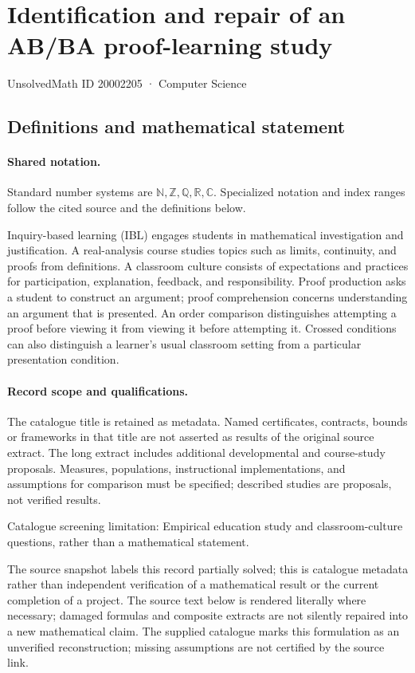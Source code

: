 \documentclass[11pt]{article}
\begin{document}
\setcounter{section}{20002204}
\section{Identification and repair of an AB/BA proof-learning study}\label{20002205}
{\small\sffamily UnsolvedMath ID 20002205 · Computer Science}
\subsection{Definitions and mathematical statement}

\paragraph{Shared notation.}Standard number systems are $\mathbb N,\mathbb Z,\mathbb Q,\mathbb R,\mathbb C$. Specialized notation and index ranges follow the cited source and the definitions below.


Inquiry-based learning (IBL) engages students in mathematical investigation and justification. A real-analysis course studies topics such as limits, continuity, and proofs from definitions. A classroom culture consists of expectations and practices for participation, explanation, feedback, and responsibility. Proof production asks a student to construct an argument; proof comprehension concerns understanding an argument that is presented. An order comparison distinguishes attempting a proof before viewing it from viewing it before attempting it. Crossed conditions can also distinguish a learner's usual classroom setting from a particular presentation condition.
\paragraph{Record scope and qualifications.}
The catalogue title is retained as metadata. Named certificates, contracts, bounds or frameworks in that title are not asserted as results of the original source extract.
The long extract includes additional developmental and course-study proposals. Measures, populations, instructional implementations, and assumptions for comparison must be specified; described studies are proposals, not verified results.

Catalogue screening limitation: Empirical education study and classroom-culture questions, rather than a mathematical statement.

The source snapshot labels this record partially solved; this is catalogue metadata rather than independent verification of a mathematical result or the current completion of a project.
The source text below is rendered literally where necessary; damaged formulas and composite extracts are not silently repaired into a new mathematical claim.
The supplied catalogue marks this formulation as an unverified reconstruction; missing assumptions are not certified by the source link.
\end{document}
